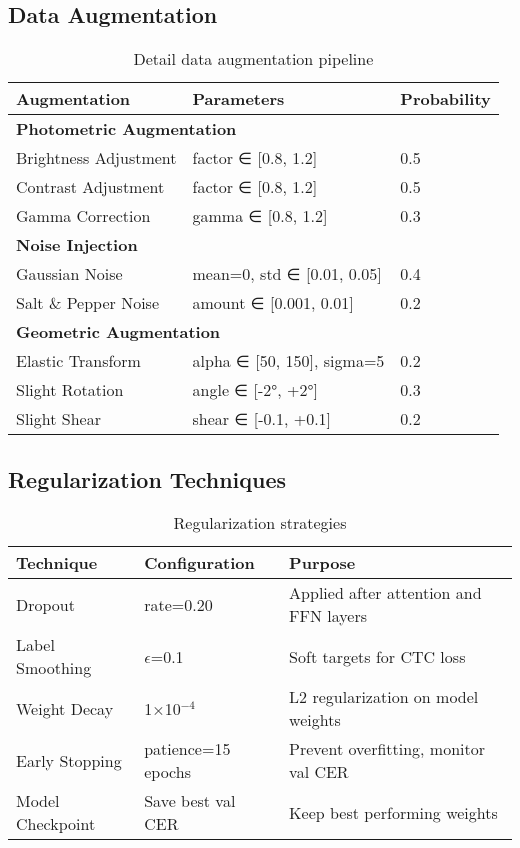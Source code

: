 \documentclass[12pt,a4paper]{article}
\begin{document}
\subsection{Data Augmentation}

\begin{table}[H]
\centering
\caption{Detail data augmentation pipeline}
\label{tab:appendix-augmentation}
\small
\begin{tabular}{|l|l|l|}
\hline
\textbf{Augmentation} & \textbf{Parameters} & \textbf{Probability} \\ \hline
\multicolumn{3}{|l|}{\textbf{Photometric Augmentation}} \\ \hline
Brightness Adjustment & factor ∈ [0.8, 1.2] & 0.5 \\ \hline
Contrast Adjustment & factor ∈ [0.8, 1.2] & 0.5 \\ \hline
Gamma Correction & gamma ∈ [0.8, 1.2] & 0.3 \\ \hline
\multicolumn{3}{|l|}{\textbf{Noise Injection}} \\ \hline
Gaussian Noise & mean=0, std ∈ [0.01, 0.05] & 0.4 \\ \hline
Salt \& Pepper Noise & amount ∈ [0.001, 0.01] & 0.2 \\ \hline
\multicolumn{3}{|l|}{\textbf{Geometric Augmentation}} \\ \hline
Elastic Transform & alpha ∈ [50, 150], sigma=5 & 0.2 \\ \hline
Slight Rotation & angle ∈ [-2°, +2°] & 0.3 \\ \hline
Slight Shear & shear ∈ [-0.1, +0.1] & 0.2 \\ \hline
\end{tabular}
\end{table}

\subsection{Regularization Techniques}

\begin{table}[H]
\centering
\caption{Regularization strategies}
\label{tab:appendix-regularization}
\small
\begin{tabular}{|l|l|p{7cm}|}
\hline
\textbf{Technique} & \textbf{Configuration} & \textbf{Purpose} \\ \hline
Dropout & rate=0.20 & Applied after attention and FFN layers \\ \hline
Label Smoothing & $\epsilon$=0.1 & Soft targets for CTC loss \\ \hline
Weight Decay & 1×10$^{-4}$ & L2 regularization on model weights \\ \hline
Early Stopping & patience=15 epochs & Prevent overfitting, monitor val CER \\ \hline
Model Checkpoint & Save best val CER & Keep best performing weights \\ \hline
\end{tabular}
\end{table}
\end{document}
